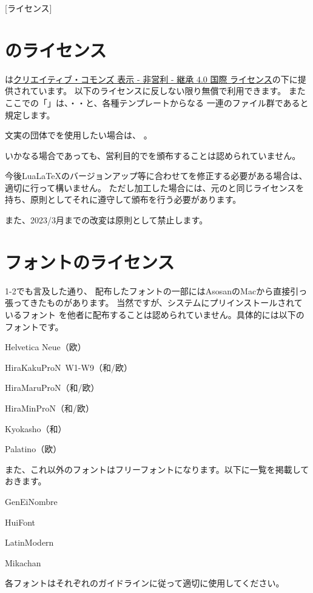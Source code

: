 \newpage
\pagestyle{booklet}
[ライセンス]
\begin{multicols*}{2}
\section{\BunTeX のライセンス}
\BunTeX は\href{https://creativecommons.org/licenses/by-nc-sa/4.0/}{クリエイティブ・コモンズ 表示 - 非営利 - 継承 4.0 国際 ライセンス}の下に提供されています。
以下のライセンスに反しない限り無償で利用できます。
またここでの「\BunTeX 」は、{\BunTeXB}・{\BunTeXC}・{\BunTeXD}と、各種テンプレートからなる
一連のファイル群であると規定します。

文実の団体で\BunTeX を使用したい場合は、
。

いかなる場合であっても、営利目的で\BunTeX を頒布することは認められていません。

今後Lua\LaTeX のバージョンアップ等に合わせて\BunTeX を修正する必要がある場合は、
適切に行って構いません。
ただし加工した場合には、元の\BunTeX と同じライセンスを持ち、原則としてそれに遵守して頒布を行う必要があります。

また、2023/3月までの改変は原則として禁止します。


\section{フォントのライセンス}
1-2でも言及した通り、
配布したフォントの一部にはAsosanのMacから直接引っ張ってきたものがあります。
当然ですが、システムにプリインストールされているフォント
を他者に配布することは認められていません。具体的には以下のフォントです。
\begin{reitemize}
    \item Helvetica Neue（欧）
    \item HiraKakuProN~W1-W9（和/欧）
    \item HiraMaruProN（和/欧）
    \item HiraMinProN（和/欧）
    \item Kyokasho（和）
    \item Palatino（欧）
\end{reitemize}

また、これ以外のフォントはフリーフォントになります。以下に一覧を掲載しておきます。
\begin{reitemize}
    \item GenEiNombre
    \item HuiFont
    \item LatinModern
    \item Mikachan
\end{reitemize}
各フォントはそれぞれのガイドラインに従って適切に使用してください。

\end{multicols*}